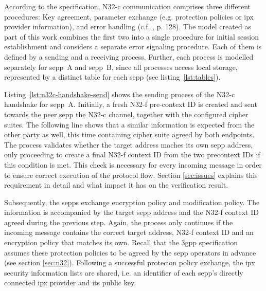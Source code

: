 According to the specification, N32-c communication comprises three different procedures: Key agreement, parameter exchange (e.g. protection policies or \gls{ipx} provider information), and error handling (c.f. \cite{3gpp.33.501}, p. 128).
The model created as part of this work combines the first two into a single procedure for initial session establishment and considers a separate error signaling procedure.
Each of them is defined by a sending and a receiving process.
Further, each process is modelled separately for \gls{sepp}~A and \gls{sepp}~B, since all processes access local storage, represented by a distinct table for each \gls{sepp} (see listing~\ref{lst:tables}).

Listing~\ref{lst:n32c-handshake-send} shows the sending process of the N32-c handshake for \gls{sepp}~A.
Initially, a fresh N32-f pre-context ID is created and sent towards the peer \gls{sepp} the N32-c channel, together with the configured cipher suites.
The following line shows that a similar information is expected from the other party as well, this time containing cipher suite agreed by both endpoints.
The process validates whether the target address maches its own \gls{sepp} address, only proceeding to create a final N32-f context ID from the two precontext IDs if this condition is met.
This check is necessary for every incoming message in order to ensure correct execution of the protocol flow.
Section \ref{sec:issues} explains this requirement in detail and what impact it has on the verification result.

Subsequently, the \glspl{sepp} exchange encryption policy and modification policy.
The information is accompanied by the target \gls{sepp} address and the N32-f context ID agreed during the previous step.
Again, the process only continues if the incoming message contains the correct target address, N32-f context ID and an encryption policy that matches its own.
Recall that the \gls{3gpp} specification assumes these protection policies to be agreed by the \gls{sepp} operators in advance (see section \ref{sec:n32}).
Following a successful protecion policy exchange, the \gls{ipx} security information lists are shared, i.e. an identifier of each \gls{sepp}'s directly connected \gls{ipx} provider and its public key.

